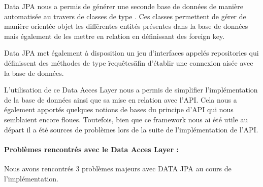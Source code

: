 \documentclass[../rapport.tex]{subfiles}
\begin{document}
	\medskip

	Data JPA nous a permis de générer une seconde base de données de manière automatisée au 
	travers de classes de type \@Entity. Ces classes permettent de gérer de manière orientée
	objet les différentes entités présentes dans la base de données mais également de les 
	mettre en relation en définissant des foreign key.

	\medskip

	Data JPA met également à disposition un jeu d'interfaces appelés repositories qui 
	définissent des méthodes de type \"requêtes\" afin d'établir une connexion aisée avec 
	la base de données.

	\medskip

	L'utilisation de ce Data Acces Layer nous a permis de simplifier l'implémentation de
	la base de données ainsi que sa mise en relation avec l'API. Cela nous a également 
	apportés quelques notions de bases du principe d'API qui nous semblaient encore floues.
	Toutefois, bien que ce framework nous ai été utile au départ il a été sources de problèmes
	lors de la suite de l'implémentation de l'API.

	\bigskip

	\paragraph{Problèmes rencontrés avec le Data Acces Layer :}
	Nous avons rencontrés 3 problèmes majeurs avec DATA JPA au cours de l'implémentation.
	
	\medskip
\end{document}
